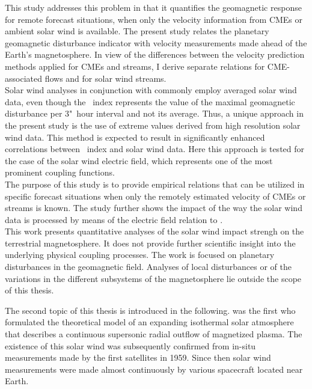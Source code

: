This study addresses this problem in that it quantifies the geomagnetic response for remote forecast situations, when only the velocity information from CMEs or ambient solar wind is available.
The present study relates the planetary geomagnetic disturbance indicator \Kp{} with velocity measurements made ahead of the Earth's magnetosphere. In view of the differences between the velocity prediction methods applied for CMEs and streams, I derive separate relations for CME-associated flows and for solar wind streams.\\

Solar wind analyses in conjunction with \Kp{} commonly employ averaged solar wind data, even though the \Kp~index represents the value of the maximal geomagnetic disturbance per 3"~hour interval and not its average. Thus, a unique approach in the present study is the use of extreme values derived from high resolution solar wind data. This method is expected to result in significantly enhanced correlations between \Kp~index and solar wind data. Here this approach is tested for the case of the solar wind electric field, which represents one of the most prominent coupling functions.\\

The purpose of this study is to provide empirical \Kp{} relations that can be utilized in specific forecast situations when only the remotely estimated velocity of CMEs or streams is known.
The study further shows the impact of the way the solar wind data is processed by means of the electric field relation to \Kp{}.\\

This work presents quantitative analyses of the solar wind impact strengh on the terrestrial magnetosphere. It does not provide further scientific insight into the underlying physical coupling processes.
The work is focused on planetary disturbances in the geomagnetic field. Analyses of local disturbances or of the variations in the different subsystems of the magnetosphere lie outside the scope of this thesis.\\


\bigskip

The second topic of this thesis is introduced in the following.
\citet{Parker1958} was the first who formulated the theoretical model of an expanding isothermal solar atmosphere that describes a continuous supersonic radial outflow of magnetized plasma. The existence of this solar wind was subsequently confirmed from in-situ measurements made by the first satellites in 1959. Since then solar wind measurements were made almost continuously by various spacecraft located near Earth.

